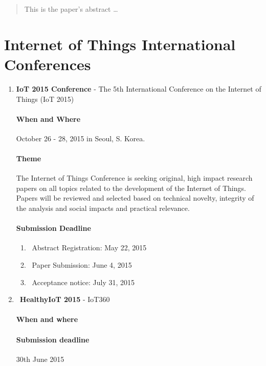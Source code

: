 \documentclass[12pt]{article}
\begin{document}
\maketitle

\begin{abstract}
This is the paper's abstract \ldots
\end{abstract}

\section{Internet of Things International Conferences}

\begin{enumerate}
\item \textbf {IoT 2015 Conference} -
The 5th International Conference on the Internet of Things (IoT 2015) 


\paragraph{When and Where} October 26 - 28, 2015 in Seoul, S. Korea.
\paragraph{Theme} The Internet of Things Conference is seeking original, high impact research papers on all topics related to the development of the Internet of Things. Papers will be reviewed and selected based on technical novelty, integrity of the analysis and social impacts and practical relevance.

\paragraph{Submission Deadline}
\begin{enumerate}
\item\ Abstract Registration: May 22, 2015
\item\ Paper Submission: June 4, 2015
\item\ Acceptance notice: July 31, 2015

\end{enumerate}
\item\ \textbf{HealthyIoT 2015} - IoT360
\paragraph {When and where}
\paragraph {Submission deadline} 30th June 2015

\end{enumerate}
\end{document}
